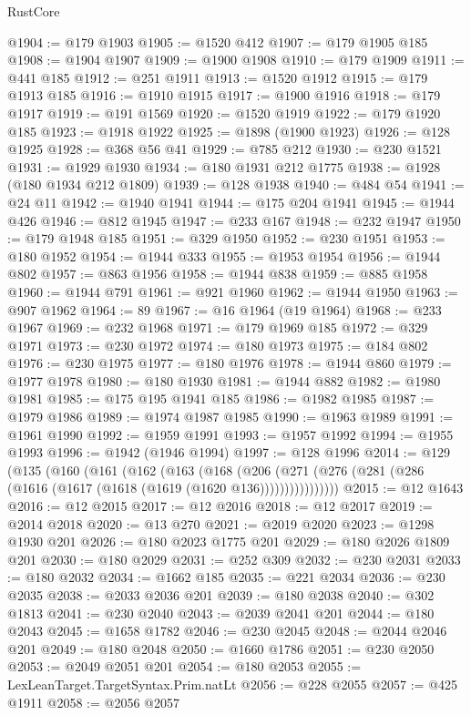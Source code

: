\begin{lexlean}{RustCore}
\begin{coremodule}
@1904 := @179 @1903
@1905 := @1520 @412
@1907 := @179 @1905 @185
@1908 := @1904 @1907
@1909 := @1900 @1908
@1910 := @179 @1909
@1911 := @441 @185
@1912 := @251 @1911
@1913 := @1520 @1912
@1915 := @179 @1913 @185
@1916 := @1910 @1915
@1917 := @1900 @1916
@1918 := @179 @1917
@1919 := @191 @1569
@1920 := @1520 @1919
@1922 := @179 @1920 @185
@1923 := @1918 @1922
@1925 := @1898 (@1900 @1923)
@1926 := @128 @1925
@1928 := @368 @56 @41
@1929 := @785 @212
@1930 := @230 @1521
@1931 := @1929 @1930
@1934 := @180 @1931 @212 @1775
@1938 := @1928 (@180 @1934 @212 @1809)
@1939 := @128 @1938
@1940 := @484 @54
@1941 := @24 @11
@1942 := @1940 @1941
@1944 := @175 @204 @1941
@1945 := @1944 @426
@1946 := @812 @1945
@1947 := @233 @167
@1948 := @232 @1947
@1950 := @179 @1948 @185
@1951 := @329 @1950
@1952 := @230 @1951
@1953 := @180 @1952
@1954 := @1944 @333
@1955 := @1953 @1954
@1956 := @1944 @802
@1957 := @863 @1956
@1958 := @1944 @838
@1959 := @885 @1958
@1960 := @1944 @791
@1961 := @921 @1960
@1962 := @1944 @1950
@1963 := @907 @1962
@1964 := 89
@1967 := @16 @1964 (@19 @1964)
@1968 := @233 @1967
@1969 := @232 @1968
@1971 := @179 @1969 @185
@1972 := @329 @1971
@1973 := @230 @1972
@1974 := @180 @1973
@1975 := @184 @802
@1976 := @230 @1975
@1977 := @180 @1976
@1978 := @1944 @860
@1979 := @1977 @1978
@1980 := @180 @1930
@1981 := @1944 @882
@1982 := @1980 @1981
@1985 := @175 @195 @1941 @185
@1986 := @1982 @1985
@1987 := @1979 @1986
@1989 := @1974 @1987 @1985
@1990 := @1963 @1989
@1991 := @1961 @1990
@1992 := @1959 @1991
@1993 := @1957 @1992
@1994 := @1955 @1993
@1996 := @1942 (@1946 @1994)
@1997 := @128 @1996
@2014 := @129
    (@135
      (@160
        (@161
          (@162
            (@163
              (@168
                (@206
                  (@271 (@276 (@281 (@286 (@1616 (@1617 (@1618 (@1619 (@1620 @136))))))))))))))))
@2015 := @12 @1643
@2016 := @12 @2015
@2017 := @12 @2016
@2018 := @12 @2017
@2019 := @2014 @2018
@2020 := @13 @270
@2021 := @2019 @2020
@2023 := @1298 @1930 @201
@2026 := @180 @2023 @1775 @201
@2029 := @180 @2026 @1809 @201
@2030 := @180 @2029
@2031 := @252 @309
@2032 := @230 @2031
@2033 := @180 @2032
@2034 := @1662 @185
@2035 := @221 @2034
@2036 := @230 @2035
@2038 := @2033 @2036 @201
@2039 := @180 @2038
@2040 := @302 @1813
@2041 := @230 @2040
@2043 := @2039 @2041 @201
@2044 := @180 @2043
@2045 := @1658 @1782
@2046 := @230 @2045
@2048 := @2044 @2046 @201
@2049 := @180 @2048
@2050 := @1660 @1786
@2051 := @230 @2050
@2053 := @2049 @2051 @201
@2054 := @180 @2053
@2055 := LexLeanTarget.TargetSyntax.Prim.natLt
@2056 := @228 @2055
@2057 := @425 @1911
@2058 := @2056 @2057

\end{coremodule}
\end{lexlean}
